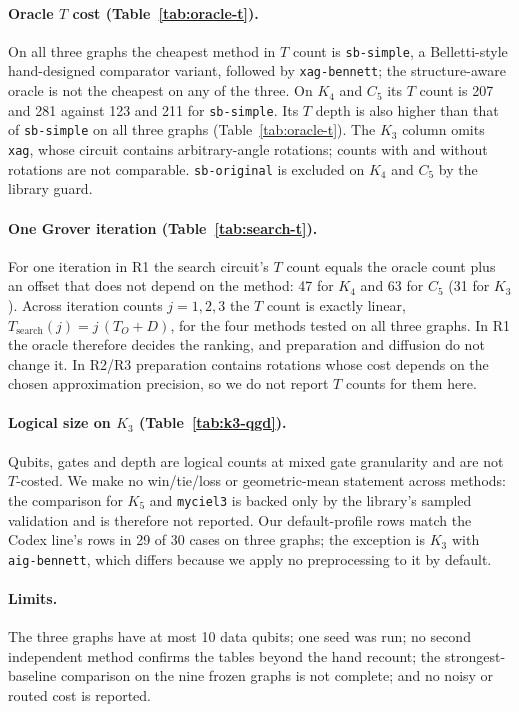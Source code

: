 \documentclass[sigconf, natbib]{acmart}
\begin{document}
\paragraph{Oracle $T$ cost (Table~\ref{tab:oracle-t}).} %
On all three graphs the cheapest method in $T$ count is \texttt{sb-simple}, a Belletti-style hand-designed comparator variant, followed by \texttt{xag-bennett}; the structure-aware oracle is not the cheapest on any of the three. On $K_4$ and $C_5$ its $T$ count is 207 and 281 against 123 and 211 for \texttt{sb-simple}. Its $T$ depth is also higher than that of \texttt{sb-simple} on all three graphs (Table~\ref{tab:oracle-t}). The $K_3$ column omits \texttt{xag}, whose circuit contains arbitrary-angle rotations; counts with and without rotations are not comparable. %
\texttt{sb-original} is excluded on $K_4$ and $C_5$ by the library guard.

\paragraph{One Grover iteration (Table~\ref{tab:search-t}).} %
For one iteration in R1 the search circuit's $T$ count equals the oracle count plus an offset that does not depend on the method: 47 for $K_4$ and 63 for $C_5$ (31 for $K_3$). Across iteration counts $j=1,2,3$ the $T$ count is exactly linear, $T_{\mathrm{search}}(j)=j\,(T_O+D)$, for the four methods tested on all three graphs. In R1 the oracle therefore decides the ranking, and preparation and diffusion do not change it. In R2/R3 preparation contains rotations whose cost depends on the chosen approximation precision, so we do not report $T$ counts for them here.

\paragraph{Logical size on $K_3$ (Table~\ref{tab:k3-qgd}).} %
Qubits, gates and depth are logical counts at mixed gate granularity and are not $T$-costed. We make no win/tie/loss or geometric-mean statement across methods: the comparison for $K_5$ and \texttt{myciel3} is backed only by the library's sampled validation and is therefore not reported. %
Our default-profile rows match the Codex line's rows in 29 of 30 cases on three graphs; the exception is $K_3$ with \texttt{aig-bennett}, which differs because we apply no preprocessing to it by default. %

\paragraph{Limits.} The three graphs have at most 10 data qubits; one seed was run; no second independent method confirms the tables beyond the hand recount; the strongest-baseline comparison on the nine frozen graphs is not complete; and no noisy or routed cost is reported.
\end{document}
